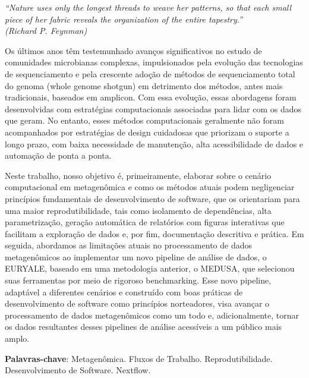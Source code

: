 \documentclass[
	12pt,				%
	oneside,			%
	a4paper,			%
	chapter=TITLE,		%
	section=TITLE,		%
	english,			%
	brazil				%
	]{abntex2}
\begin{document}
\begin{epigrafe}
	\vspace*{\fill}
	\begin{flushright}
		\textit{``Nature uses only the longest threads to weave her patterns, so that each small piece of her fabric reveals the organization of the entire tapestry.''\\
(Richard P. Feynman)}
	\end{flushright}
\end{epigrafe}


\setlength{\absparsep}{18pt} %
\begin{resumo}
	\SingleSpacing
  Os últimos anos têm testemunhado avanços significativos no estudo de comunidades microbianas complexas, impulsionados pela evolução das tecnologias de sequenciamento e pela crescente adoção de métodos de sequenciamento total do genoma (whole genome shotgun) em detrimento dos métodos, antes mais tradicionais, baseados em amplicon. Com essa evolução, essas abordagens foram desenvolvidas com estratégias computacionais associadas para lidar com os dados que geram. No entanto, esses métodos computacionais geralmente não foram acompanhados por estratégias de design cuidadosas que priorizam o suporte a longo prazo, com baixa necessidade de manutenção, alta acessibilidade de dados e automação de ponta a ponta.

  Neste trabalho, nosso objetivo é, primeiramente, elaborar sobre o cenário computacional em metagenômica e como os métodos atuais podem negligenciar princípios fundamentais de desenvolvimento de software, que os orientariam para uma maior reprodutibilidade, tais como isolamento de dependências, alta parametrização, geração automática de relatórios com figuras interativas que facilitam a exploração de dados e, por fim, documentação descritiva e prática. Em seguida, abordamos as limitações atuais no processamento de dados metagenômicos ao implementar um novo pipeline de análise de dados, o EURYALE, baseado em uma metodologia anterior, o MEDUSA, que selecionou suas ferramentas por meio de rigoroso benchmarking. Esse novo pipeline, adaptável a diferentes cenários e construído com boas práticas de desenvolvimento de software como princípios norteadores, visa avançar o processamento de dados metagenômicos como um todo e, adicionalmente, tornar os dados resultantes desses pipelines de análise acessíveis a um público mais amplo.

  \textbf{Palavras-chave}:
    Metagenômica.
    Fluxos de Trabalho.
    Reprodutibilidade.
    Desenvolvimento de Software.
    Nextflow.
  \end{resumo}
\end{document}
